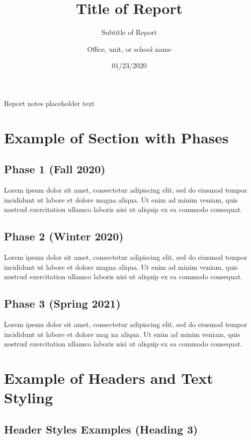 \documentclass[notitlepage]{nyu22report}
\title{Title of Report}
\subtitle{Subtitle of Report}
\author{Office, unit, or school name}
\date{01/23/2020}
\begin{document}
\begin{titlingpage}
    \maketitle
    Report notes placeholder text
\end{titlingpage}

\tableofcontents

\chapter{Example of Section with Phases}

\section*{Phase 1 (Fall 2020)}
Lorem ipsum dolor sit amet, consectetur adipiscing elit, sed do eiusmod tempor
incididunt ut labore et dolore magna aliqua. Ut enim ad minim veniam, quis
nostrud exercitation ullamco laboris nisi ut aliquip ex ea commodo consequat.

\section*{Phase 2 (Winter 2020)}

Lorem ipsum dolor sit amet, consectetur adipiscing elit, sed do eiusmod tempor
incididunt ut labore et dolore magna aliqua. Ut enim ad minim veniam, quis
nostrud exercitation ullamco laboris nisi ut aliquip ex ea commodo consequat.

\section*{Phase 3 (Spring 2021)}

Lorem ipsum dolor sit amet, consectetur adipiscing elit, sed do eiusmod tempor
incididunt ut labore et dolore mag  na aliqua. Ut enim ad minim veniam, quis
nostrud exercitation ullamco laboris nisi ut aliquip ex ea commodo consequat.


\chapter{Example of Headers and Text Styling}

\section{Header Styles Examples (Heading 3)}
\end{document}
